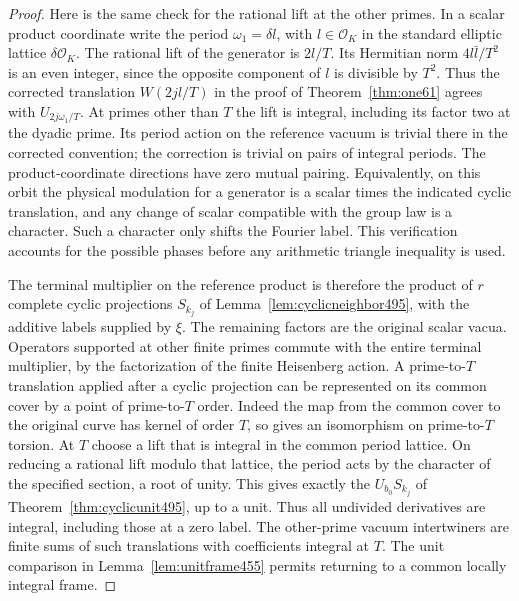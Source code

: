 \documentclass[a4paper,11pt]{article}
\theoremstyle{definition}
\theoremstyle{remark}
\numberwithin{equation}{section}
\begin{document}
\begin{proof}
Here is the same check for the rational lift at the other
primes. In a scalar product coordinate write the period
\(\omega_1=\delta l\), with \(l\in\mathcal O_K\) in the
standard elliptic lattice \(\delta\mathcal O_K\).
The rational lift of the generator is \(2l/T\).
Its Hermitian norm \(4l\bar l/T^2\) is an even integer, since
the opposite component of \(l\) is divisible by \(T^2\).
Thus the corrected translation \(W(2jl/T)\) in the proof of
Theorem~\ref{thm:one61} agrees with \(U_{2j\omega_1/T}\).
At primes other than \(T\) the lift is integral, including
its factor two at the dyadic prime. Its period action on the
reference vacuum is trivial there in the corrected convention;
the correction is trivial on pairs of integral periods.
The product-coordinate directions have zero mutual pairing.
Equivalently, on this orbit the physical modulation for a
generator is a scalar times the indicated cyclic translation,
and any change of scalar compatible with the group law is a
character. Such a character only shifts the Fourier label.
This verification accounts for the possible phases before
any arithmetic triangle inequality is used.

The terminal multiplier on the reference product is therefore
the product of \(r\) complete cyclic projections \(S_{k_j}\)
of Lemma~\ref{lem:cyclicneighbor495}, with the additive
labels supplied by \(\xi\). The remaining factors are the
original scalar vacua. Operators supported at other finite
primes commute with the entire terminal multiplier, by the
factorization of the finite Heisenberg action. A prime-to-\(T\)
translation applied after a cyclic projection can be represented
on its common cover by a point of prime-to-\(T\) order.
Indeed the map from the common cover to the original curve
has kernel of order \(T\), so gives an isomorphism on
prime-to-\(T\) torsion. At \(T\) choose a lift that is integral
in the common period lattice. On reducing a rational lift
modulo that lattice, the period acts by the character of the
specified section, a root of unity. This gives exactly the
\(U_{b_0}S_{k_j}\) of Theorem~\ref{thm:cyclicunit495}, up
to a unit. Thus all undivided derivatives are integral,
including those at a zero label. The other-prime vacuum
intertwiners are finite sums of such translations with
coefficients integral at \(T\). The unit comparison in
Lemma~\ref{lem:unitframe455} permits returning to a common
locally integral frame.
\end{proof}
\end{document}
